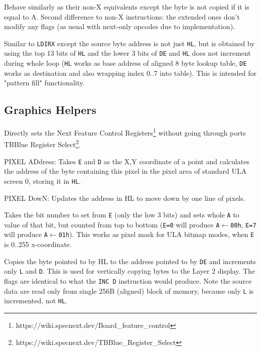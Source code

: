 \documentclass[oneside,a4paper]{book}
\begin{document}
\begin{description}
	

	Behave similarly as their non-X equivalents except the byte is not copied if it is equal to A. Second difference to non-X instructions: the extended ones don't modify any flags (as usual with next-only opcodes due to implementation).


	Similar to {\tt LDIRX} except the source byte address is not just {\tt HL}, but is obtained by using the top 13 bits of {\tt HL} and the lower 3 bits of {\tt DE} and {\tt HL} does not increment during whole loop ({\tt HL} works as base address of aligned 8 byte lookup table, {\tt DE} works as destination and also wrapping index 0..7 into table). This is intended for "pattern fill" functionality.
	
\end{description}

\subsection{Graphics Helpers}

\begin{description}


	Directly sets the Next Feature Control Registers\footnote{https://wiki.specnext.dev/Board\_feature\_control} without going through ports TBBlue Register Select\footnote{https://wiki.specnext.dev/TBBlue\_Register\_Select}.


	PIXEL ADdress: Takes {\tt E} and {\tt D} as the X,Y coordinate of a point and calculates the address of the byte containing this pixel in the pixel area of standard ULA screen 0, storing it in {\tt HL}.


	PIXEL DowN: Updates the address in HL to move down by one line of pixels.


	Takes the bit number to set from {\tt E} (only the low 3 bits) and sets whole {\tt A} to value of that bit, but counted from top to bottom ({\tt E=0} will produce {\tt A$\leftarrow$80h}, {\tt E=7} will produce {\tt A$\leftarrow$01h}). This works as pixel mask for ULA bitmap modes, when {\tt E} is 0..255 x-coordinate.
		

	Copies the byte pointed to by HL to the address pointed to by {\tt DE} and increments only {\tt L} and {\tt D}. This is used for vertically copying bytes to the Layer 2 display. The flags are identical to what the {\tt INC D} instruction would produce. Note the source data are read only from single 256B (aligned) block of memory, because only {\tt L} is incremented, not {\tt HL}.

\end{description}
\end{document}
